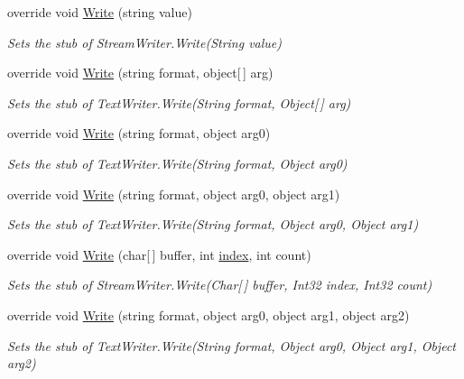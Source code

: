 \begin{DoxyCompactItemize}
override void \hyperlink{class_system_1_1_i_o_1_1_fakes_1_1_stub_stream_writer_ad4f8c23916991ad51872c0c9ebc848a0}{Write} (string value)
\begin{DoxyCompactList}\small\item\em Sets the stub of Stream\-Writer.\-Write(\-String value)\end{DoxyCompactList}\item 
override void \hyperlink{class_system_1_1_i_o_1_1_fakes_1_1_stub_stream_writer_a2c5d9d6baaba9e58807a6737ba70738e}{Write} (string format, object\mbox{[}$\,$\mbox{]} arg)
\begin{DoxyCompactList}\small\item\em Sets the stub of Text\-Writer.\-Write(\-String format, Object\mbox{[}$\,$\mbox{]} arg)\end{DoxyCompactList}\item 
override void \hyperlink{class_system_1_1_i_o_1_1_fakes_1_1_stub_stream_writer_a235d92700c9fcd6051068d6490ae6f81}{Write} (string format, object arg0)
\begin{DoxyCompactList}\small\item\em Sets the stub of Text\-Writer.\-Write(\-String format, Object arg0)\end{DoxyCompactList}\item 
override void \hyperlink{class_system_1_1_i_o_1_1_fakes_1_1_stub_stream_writer_ac738b531f491bd230842da8eb3c23731}{Write} (string format, object arg0, object arg1)
\begin{DoxyCompactList}\small\item\em Sets the stub of Text\-Writer.\-Write(\-String format, Object arg0, Object arg1)\end{DoxyCompactList}\item 
override void \hyperlink{class_system_1_1_i_o_1_1_fakes_1_1_stub_stream_writer_aa786a51e0b5ae2f39418d1f19f82a427}{Write} (char\mbox{[}$\,$\mbox{]} buffer, int \hyperlink{jquery-1_810_82-vsdoc_8js_a75bb12d1f23302a9eea93a6d89d0193e}{index}, int count)
\begin{DoxyCompactList}\small\item\em Sets the stub of Stream\-Writer.\-Write(\-Char\mbox{[}$\,$\mbox{]} buffer, Int32 index, Int32 count)\end{DoxyCompactList}\item 
override void \hyperlink{class_system_1_1_i_o_1_1_fakes_1_1_stub_stream_writer_a7dd58c7a2cb61fe03a0677a5e94abf8e}{Write} (string format, object arg0, object arg1, object arg2)
\begin{DoxyCompactList}\small\item\em Sets the stub of Text\-Writer.\-Write(\-String format, Object arg0, Object arg1, Object arg2)\end{DoxyCompactList}\item 

\end{DoxyCompactItemize}
